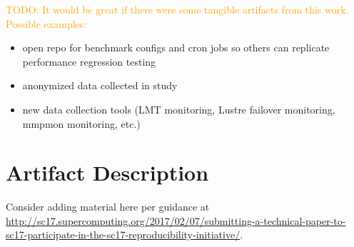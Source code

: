 \documentclass[conference,10pt,compsocconf]{IEEEtran}
\newcommand{\todo}[1]{\textcolor{Orange}{TODO: #1}}
\begin{document}
\todo{It would be great if there were some tangible artifacts from this work.
Possible examples:}
\begin{itemize}
\item open repo for benchmark configs and cron jobs so others can replicate
performance regression testing
\item anonymized data collected in study
\item new data collection tools (LMT monitoring, Lustre failover monitoring,
mmpmon monitoring, etc.)
\end{itemize}

% 
% 
% 
% 
% 
% 
% 




\appendix

\section{Artifact Description}

Consider adding material here per guidance at
\url{http://sc17.supercomputing.org/2017/02/07/submitting-a-technical-paper-to-sc17-participate-in-the-sc17-reproducibility-initiative/}.
\end{document}
